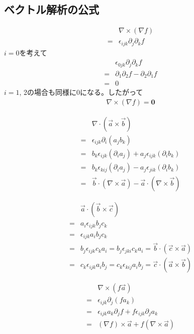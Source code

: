 \subsection{ベクトル解析の公式}

\begin{align}
&\nabla\times\left(\nabla f\right)\\
=&\epsilon_{ijk}\partial_j\partial_k f
\end{align}
$i=0$を考えて
\begin{align}
&\epsilon_{0jk}\partial_j\partial_k f\\
=&\partial_1\partial_2 f-\partial_2\partial_1 f\\
=&0
\end{align}
$i=1$, 2の場合も同様に0になる。したがって
\begin{align}
\nabla\times\left(\nabla f\right)=\bm{0}
\end{align}

\begin{align}
&\nabla\cdot\left(\vec{a}\times\vec{b}\right)\\
=&\epsilon_{ijk}\partial_i\left(a_jb_k\right)\\
=&b_k\epsilon_{ijk}\left(\partial_ia_j\right)
 +a_j\epsilon_{ijk}\left(\partial_ib_k\right)\\
=&b_k\epsilon_{kij}\left(\partial_ia_j\right)
 -a_j\epsilon_{jik}\left(\partial_ib_k\right)\\
=&\vec{b}\cdot\left(\nabla\times\vec{a}\right)
 -\vec{a}\cdot\left(\nabla\times\vec{b}\right)
\end{align}

\begin{align}
&\vec{a}\cdot\left(\vec{b}\times\vec{c}\right)\\
=&a_i\epsilon_{ijk}b_jc_k\\
=&\epsilon_{ijk}a_ib_jc_k\\
=&b_j\epsilon_{ijk}c_ka_i=b_j\epsilon_{jki}c_ka_i
 =\vec{b}\cdot\left(\vec{c}\times\vec{a}\right)\\
=&c_k\epsilon_{ijk}a_ib_j=c_k\epsilon_{kij}a_ib_j
 =\vec{c}\cdot\left(\vec{a}\times\vec{b}\right)
\end{align}

\begin{align}
&\nabla\times\left(f\vec{a}\right)\\
=&\epsilon_{ijk}\partial_j\left(fa_k\right)\\
=&\epsilon_{ijk}a_k\partial_jf+f\epsilon_{ijk}\partial_ja_k\\
=&\left(\nabla f\right)\times\vec{a}+f\left(\nabla\times\vec{a}\right)
\end{align}

